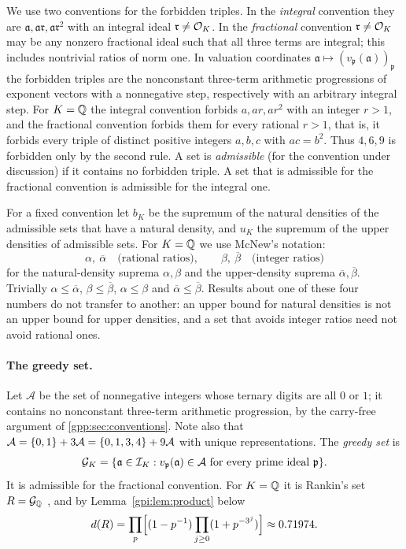 We use two conventions for the forbidden triples. In the \emph{integral} convention they are
$\mathfrak a,\mathfrak a\mathfrak r,\mathfrak a\mathfrak r^2$ with an integral ideal
$\mathfrak r\ne\mathcal{O}_K$. In the \emph{fractional} convention $\mathfrak r\ne\mathcal{O}_K$ may be any
nonzero fractional ideal such that all three terms are integral; this includes nontrivial
ratios of norm one. In valuation coordinates
$\mathfrak a\mapsto(v_{\mathfrak p}(\mathfrak a))_{\mathfrak p}$ the forbidden triples are the
nonconstant three-term arithmetic progressions of exponent vectors with a nonnegative step,
respectively with an arbitrary integral step. For $K=\mathbb{Q}$ the integral convention forbids
$a,ar,ar^2$ with an integer $r>1$, and the fractional convention forbids them for every
rational $r>1$, that is, it forbids every triple of distinct positive integers $a,b,c$ with
$ac=b^2$. Thus $4,6,9$ is forbidden only by the second rule. A set is \emph{admissible} (for
the convention under discussion) if it contains no forbidden triple. A set that is admissible
for the fractional convention is admissible for the integral one.

For a fixed convention let $b_K$ be the supremum of the natural densities of the admissible
sets that have a natural density, and $u_K$ the supremum of the upper densities of admissible
sets. For $K=\mathbb{Q}$ we use McNew's notation:
\[
 \alpha,\ \overline\alpha\quad\text{(rational ratios)},\qquad
 \beta,\ \overline\beta\quad\text{(integer ratios)}
\]
for the natural-density suprema $\alpha,\beta$ and the upper-density suprema
$\overline\alpha,\overline\beta$. Trivially $\alpha\le\overline\alpha$,
$\beta\le\overline\beta$, $\alpha\le\beta$ and $\overline\alpha\le\overline\beta$. Results
about one of these four numbers do not transfer to another: an upper bound for natural
densities is not an upper bound for upper densities, and a set that avoids integer ratios
need not avoid rational ones.

\paragraph{The greedy set.}
Let $\mathcal A$ be the set of nonnegative integers whose ternary digits are all $0$ or $1$;
it contains no nonconstant three-term arithmetic progression, by the carry-free argument
of \cref{gpp:sec:conventions}. Note also that
$\mathcal A=\{0,1\}+3\mathcal A=\{0,1,3,4\}+9\mathcal A$ with unique representations. The
\emph{greedy set} is
\[
 \mathcal G_K=\{\mathfrak a\in\mathcal I_K:v_{\mathfrak p}(\mathfrak a)\in\mathcal A
 \text{ for every prime ideal }\mathfrak p\}.
\]
It is admissible for the fractional convention. For $K=\mathbb{Q}$ it is Rankin's set
$R=\mathcal G_{\mathbb{Q}}$ \cite{Rankin1961Sets}, and by Lemma~\ref{gpi:lem:product} below
\[
 d(R)=\prod_p\Bigl[(1-p^{-1})\prod_{j\ge0}(1+p^{-3^j})\Bigr]\approx0.71974 .
\]

